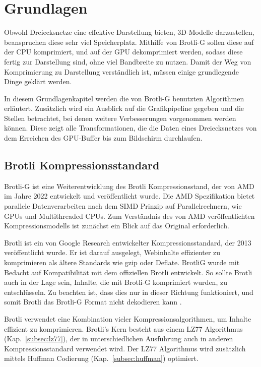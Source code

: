 \section{Grundlagen}

Obwohl Dreiecksnetze eine effektive Darstellung bieten, 3D-Modelle darzustellen, beanspruchen diese sehr viel Speicherplatz.
Mithilfe von Brotli-G sollen diese auf der CPU komprimiert, und auf der GPU dekomprimiert werden, sodass diese fertig zur Darstellung sind, ohne viel Bandbreite zu nutzen.
Damit der Weg von Komprimierung zu Darstellung verständlich ist, müssen einige grundlegende Dinge geklärt werden.

In diesem Grundlagenkapitel werden die von Brotli-G benutzten Algorithmen erläutert.
Zusätzlich wird ein Ausblick auf die Grafikpipeline gegeben und die Stellen betrachtet, bei denen weitere Verbesserungen vorgenommen werden können.
Diese zeigt alle Transformationen, die die Daten eines Dreiecksnetzes von dem Erreichen des GPU-Buffer bis zum Bildschirm durchlaufen.

\subsection{Brotli Kompressionsstandard}
\label{subsec:brotli}
Brotli-G ist eine Weiterentwicklung des Brotli Kompressionsstand, der von AMD im Jahre 2022 entwickelt und veröffentlicht wurde.
Die AMD Spezifikation bietet parallele Datenverarbeiten nach dem SIMD Prinzip auf Parallelrechnern, wie GPUs und Multithreaded CPUs.
Zum Verständnis des von AMD veröffentlichten Kompressionsmodells ist zunächst ein Blick auf das Original erforderlich. \newline

Brotli ist ein von Google Research entwickelter Kompressionsstandard, der 2013 veröffentlicht wurde.
Er ist darauf ausgelegt, Webinhalte effizienter zu komprimieren als ältere Standards wie gzip oder Deflate.
BrotliG wurde mit Bedacht auf Kompatibilität mit dem offiziellen Brotli entwickelt.
So sollte Brotli auch in der Lage sein, Inhalte, die mit Brotli-G komprimiert wurden, zu entschlüsseln.
Zu beachten ist, dass dies nur in dieser Richtung funktioniert, und somit Brotli das Brotli-G Format nicht dekodieren kann  \cite{BrotliG2022}.

Brotli verwendet eine Kombination vieler Kompressionsalgorithmen, um Inhalte effizient zu komprimieren. 
Brotli's Kern besteht aus einem LZ77 Algorithmus (Kap.~\ref{subsec:lz77}), der in unterschiedlichen Ausführung auch in anderen Kompressionsstandard verwendet wird.
Der LZ77 Algorithmus wird zusätzlich mittels Huffman Codierung (Kap.~\ref{subsec:huffman}) optimiert.

